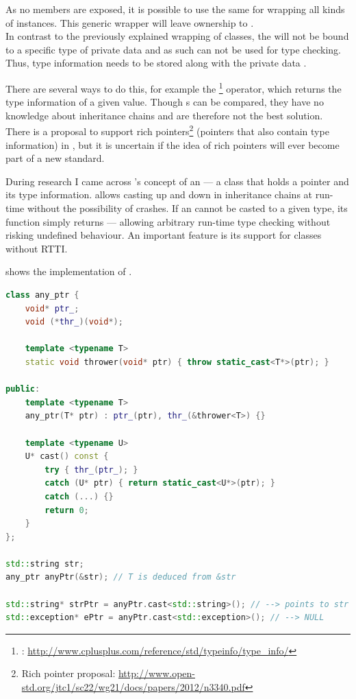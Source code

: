 As no members are exposed, it is possible to use the same  for wrapping all kinds of  instances. This generic wrapper will leave ownership to .\\
In contrast to the previously explained wrapping of classes, the   will not be bound to a specific type of private data and as such can not be used for type checking. Thus, type information needs to be stored along with the private data .

There are several ways to do this, for example the  \footnote{: \url{http://www.cplusplus.com/reference/std/typeinfo/type_info/}} operator, which returns the type information of a given value. Though s can be compared, they have no knowledge about inheritance chains and are therefore not the best solution.\\
There is a proposal to support rich pointers\footnote{Rich pointer proposal: \url{http://www.open-std.org/jtc1/sc22/wg21/docs/papers/2012/n3340.pdf}} (pointers that also contain type information) in , but it is uncertain if the idea of rich pointers will ever become part of a new  standard.

During research I came across 's concept of an  --- a class that holds a pointer and its type information.  allows casting up and down in inheritance chains at run-time without the possibility of crashes. If an  cannot be casted to a given type, its  function simply returns  --- allowing arbitrary run-time type checking without risking undefined behaviour. An important feature is its support for classes without RTTI.

 shows the implementation of . 

\newpage
\begin{lstlisting}[language=C++, caption=Implementation of \mySCName{any\_ptr}, label=lst:anyptr]
class any_ptr {
    void* ptr_;
    void (*thr_)(void*);
 
    template <typename T>
    static void thrower(void* ptr) { throw static_cast<T*>(ptr); }
 
public:
    template <typename T>
    any_ptr(T* ptr) : ptr_(ptr), thr_(&thrower<T>) {}
 
    template <typename U>
    U* cast() const {
        try { thr_(ptr_); }
        catch (U* ptr) { return static_cast<U*>(ptr); }
        catch (...) {}
        return 0;
    }
};

std::string str;
any_ptr anyPtr(&str); // T is deduced from &str

std::string* strPtr = anyPtr.cast<std::string>(); // --> points to str
std::exception* ePtr = anyPtr.cast<std::exception>(); // --> NULL
\end{lstlisting}
\OnehalfSpacing

